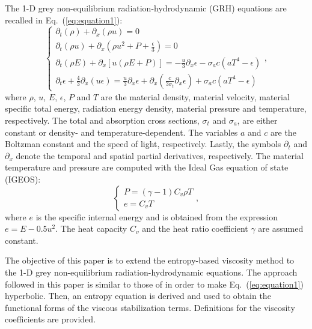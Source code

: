 \documentclass[review]{elsarticle}
\newcommand{\eqt}[1]{Eq.~(\ref{#1})}                     %
\begin{document}
The 1-D grey non-equilibrium radiation-hydrodynamic (GRH) equations are recalled in \eqt{eq:equation1}:
\begin{equation}
\label{eq:equation1}
\left\{
\begin{array}{lll}
\partial_t \left( \rho \right) + \partial_x\left( \rho u \right) = 0 \\
\partial_t \left( \rho u\right) + \partial_x \left(\rho u^2 + P + \frac{\epsilon}{3} \right) = 0 \\
\partial_t \left( \rho E\right) + \partial_x \left[ u \left( \rho E + P \right) \right] = -\frac{u}{3} \partial_x \epsilon - \sigma_a c \left( a T^4 - \epsilon \right) \\
\partial_t \epsilon + \frac{4}{3} \partial_x \left( u \epsilon \right) = \frac{u}{3} \partial_x \epsilon + \partial_x \left( \frac{c}{3 \sigma_t} \partial_x \epsilon \right) + \sigma_a c \left( a T^4 - \epsilon \right)
\end{array}
\right. ,
\end{equation}
where $\rho$, $u$, $E$, $\epsilon$, $P$ and $T$ are the material density, material velocity, material specific total energy, radiation energy density, material pressure and temperature, respectively. The total and absorption cross sections, $\sigma_t$ and $\sigma_a$, are either constant or density- and temperature-dependent. The variables $a$ and $c$ are the Boltzman constant and the speed of light, respectively. Lastly, the symbols $\partial_t$ and $\partial_x$ denote the temporal and spatial partial derivatives, respectively. 
The material temperature and pressure are computed with the Ideal Gas equation of state (IGEOS):
\begin{equation}
\label{eq:equation2}
\left\{
\begin{array}{ll}
P = (\gamma-1) C_v \rho T \\
e = C_v T 
\end{array}
\right. ,
\end{equation}
where $e$ is the specific internal energy and is obtained from the expression $e = E - 0.5 u^2$. The heat capacity $C_v$ and the heat ratio coefficient $\gamma$ are assumed constant. 

The objective of this paper is to extend the entropy-based viscosity method to the 1-D grey non-equilibrium radiation-hydrodynamic equations. The approach followed in this paper is similar to those of \cite{Balsara, LowrieMorel} in order to make \eqt{eq:equation1} hyperbolic. Then, an entropy equation is derived and used to obtain the functional forms of the viscous stabilization terms. Definitions for the viscosity coefficients are provided. 
\end{document}
